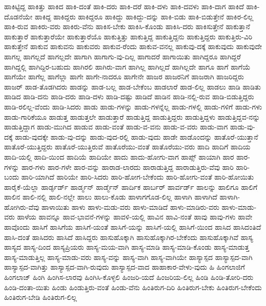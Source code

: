 {ಹಾಕಿಟ್ಟಿದ್ದ
ಹಾಕಿತ್ತು
ಹಾಕಿದ
ಹಾಕಿ-ದಂತೆ
ಹಾಕಿ-ದರು
ಹಾಕಿ-ದರೆ
ಹಾಕಿ-ದಳು
ಹಾಕಿ-ದವಳು
ಹಾಕಿ-ದಾಗ
ಹಾಕಿದೆ
ಹಾಕಿ-ದೊಡನೆಯೇ
ಹಾಕಿದ್ದ
ಹಾಕಿದ್ದರು
ಹಾಕಿದ್ದರೂ
ಹಾಕಿದ್ದು
ಹಾಕಿದ್ದು-ದನ್ನು
ಹಾಕಿ-ಬಿಡು
ಹಾಕಿ-ಬಿಡುತ್ತೇನೆ
ಹಾಕಿರ-ಲಿಲ್ಲ
ಹಾಕಿ-ರುವ
ಹಾಕಿರು-ವರು
ಹಾಕಿರು-ವೆನು
ಹಾಕಿಸ-ಬೇಕು
ಹಾಕಿಸಿ-ಕೊಂಡು
ಹಾಕಿಸಿ-ದರು
ಹಾಕಿಸುತ್ತೇನೆ
ಹಾಕುತ್ತಾನೆ
ಹಾಕುತ್ತಾರೆ
ಹಾಕುತ್ತಾರೆಯೇ
ಹಾಕುತ್ತಾರೆಯೊ
ಹಾಕುತ್ತಿತ್ತು
ಹಾಕುತ್ತಿದ್ದ
ಹಾಕುತ್ತಿದ್ದನು
ಹಾಕುತ್ತಿದ್ದರು
ಹಾಕುತ್ತಿರು-ವಿರಿ
ಹಾಕುತ್ತೇನೆ
ಹಾಕುವ
ಹಾಕುವನು
ಹಾಕುವರು
ಹಾಕುವ-ರೆಂದು
ಹಾಕುವ-ವನಲ್ಲ
ಹಾಕುವು-ದಕ್ಕೆ
ಹಾಕುವುದು
ಹಾಕುವುದೇ
ಹಾಗಲ್ಲ
ಹಾಗಲ್ಲದೆ
ಹಾಗಲ್ಲದೇ
ಹಾಗಾಗಿ
ಹಾಗಾಗು-ವು-ದಿಲ್ಲ
ಹಾಗಾದರೆ
ಹಾಗಾಯಿತು
ಹಾಗಿದ್ದರೂ
ಹಾಗಿದ್ದರೆ
ಹಾಗಿದ್ದಲ್ಲಿ
ಹಾಗಿದ್ದಿರ-ಬಹುದು
ಹಾಗಿರಲಿ
ಹಾಗಿರು-ವಾಗ
ಹಾಗಿಲ್ಲ
ಹಾಗಿಲ್ಲದೆ
ಹಾಗಿಲ್ಲದೇ
ಹಾಗೂ
ಹಾಗೆ
ಹಾಗೆಯೆ
ಹಾಗೆಯೇ
ಹಾಗೆಲ್ಲ
ಹಾಗೆಲ್ಲಾ
ಹಾಗೇ
ಹಾಗೇ-ನಾದರೂ
ಹಾಗೇನೇ
ಹಾಜರ
ಹಾಜರನಿಗೆ
ಹಾಜರಾಗಿ
ಹಾಜರಿದ್ದರು
ಹಾಜರ್
ಹಾಡ-ತೊಡಗಿದರು
ಹಾಡನ್ನು
ಹಾಡ-ಬಲ್ಲ
ಹಾಡ-ಬೇಕೆಂಬ
ಹಾಡಲಾರೆ
ಹಾಡ-ಲಿಲ್ಲ
ಹಾಡಲು
ಹಾಡಿ
ಹಾಡಿತು
ಹಾಡಿದ
ಹಾಡಿ-ದನು
ಹಾಡಿ-ದರು
ಹಾಡಿ-ದಳು
ಹಾಡಿ-ದಷ್ಟು
ಹಾಡಿದೆ
ಹಾಡಿನ
ಹಾಡಿ-ನಲ್ಲಿ-ರುವ
ಹಾಡಿ-ಬಿಡುತ್ತಿದ್ದರು
ಹಾಡಿ-ರಲಿಲ್ಲ-ವೆಂದು
ಹಾಡಿ-ಸಿದರು
ಹಾಡು
ಹಾಡು-ಗಳನ್ನು
ಹಾಡು-ಗಳನ್ನೆಲ್ಲ
ಹಾಡು-ಗಳಲ್ಲಿ
ಹಾಡು-ಗಳಿಗೆ
ಹಾಡು-ಗಳು
ಹಾಡು-ಗಾರಿಕೆಯೂ
ಹಾಡುತ್ತ
ಹಾಡುತ್ತಲೇ
ಹಾಡುತ್ತಾರೆ
ಹಾಡುತ್ತಿದ್ದ
ಹಾಡುತ್ತಿದ್ದರು
ಹಾಡುತ್ತಿದ್ದಳು
ಹಾಡುತ್ತಿದ್ದವ-ನನ್ನು
ಹಾಡುತ್ತಿದ್ದಾಗ
ಹಾಡು-ಮುಗಿದ
ಹಾಡುವ
ಹಾಡು-ವಂತೆ
ಹಾಡು-ವ-ವನು
ಹಾಡು-ವ-ವರು
ಹಾಡು-ವಾಗ
ಹಾಡು-ವು-ದಕ್ಕೆ
ಹಾಡು-ವುದಕ್ಕೇ
ಹಾಡು-ವು-ದನ್ನು
ಹಾಡು-ವುದ-ರಲ್ಲಿ
ಹಾಡು-ವುದು
ಹಾಡೇ
ಹಾಡೊಂದನ್ನು
ಹಾತೊರೆ-ಯುತ್ತಾನೆ
ಹಾತೊರೆ-ಯುತ್ತಿದ್ದರು
ಹಾತೊರೆ-ಯುತ್ತಿರುವೆ
ಹಾತೊರೆಯು-ವಂತೆ
ಹಾತೊರೆಯು-ವರು
ಹಾದಿ
ಹಾದಿಗೆ
ಹಾದಿಯ
ಹಾದಿ-ಯಲ್ಲಿ
ಹಾದಿ-ಯಿಂದ
ಹಾದಿಯೆ
ಹಾದಿಯೇ
ಹಾದು
ಹಾದು-ಹೋಗು-ವಾಗ
ಹಾಪ್ಸ್
ಹಾಯಾಗಿ
ಹಾರ
ಹಾರ-ಗಳನ್ನು
ಹಾರ-ಗಳು
ಹಾರ-ಗಳೇ
ಹಾರ-ವನ್ನು
ಹಾರಾಡ-ಲಾರದು
ಹಾರಾಡುತ್ತಿದ್ದ
ಹಾರಾಡುತ್ತಿರು-ವೆವು
ಹಾರಿ
ಹಾರಿ-ಬಂದು
ಹಾರಿ-ಯಾಗಿದೆ
ಹಾರಿಯೇ
ಹಾರಿ-ಸಿದರು
ಹಾರಿ-ಹೋಗ-ಬೇಕೆಂದು
ಹಾರಿ-ಹೋಗು-ವಂತೆ
ಹಾರಿ-ಹೋಯಿತು
ಹಾರೈಕೆ-ಯೆಲ್ಲಾ
ಹಾರ್ಡ್ಫರ್ಡ್
ಹಾರ್ಡ್ಮನ್
ಹಾರ್ಡ್ಮೆನ್
ಹಾರ್ದಿಕ
ಹಾರ್ಬರ್
ಹಾರ್ವರ್ಡ್
ಹಾಲನ್ನು
ಹಾಲಿಗೂ
ಹಾಲಿಗೆ
ಹಾಲಿನ
ಹಾಲಿ-ನಲ್ಲಿ
ಹಾಲಿ-ನಲ್ಲೇ
ಹಾಲು
ಹಾಲು-ಕೊಡು
ಹಾಳಾಗಗೊಡ-ಲಿಲ್ಲ
ಹಾಳಾಗಿ
ಹಾಳಾಗಿದೆ
ಹಾಳಾಗಿ-ಹೋಗಿರು-ವೆವು
ಹಾಳಾಯಿತು
ಹಾಳು
ಹಾಳು-ಮಡು-ವರು
ಹಾಳು-ಮಾಡಿದೆ
ಹಾಳು-ಮಾಡಿರು-ವರು
ಹಾಳು-ಮಾಡು-ವರು
ಹಾಳೆಯ
ಹಾವನ್ನೂ
ಹಾವ-ಭಾವನೆ-ಗಳನ್ನು
ಹಾವಳಿ-ಯಲ್ಲಿ
ಹಾವಿನ
ಹಾವಿ-ನಂತೆ
ಹಾವು
ಹಾವು-ಗಳು
ಹಾವೇ
ಹಾವೊಂದು
ಹಾಸಿಗೆ
ಹಾಸಿಗೆಯ
ಹಾಸಿಗೆ-ಯಂತೆ
ಹಾಸಿಗೆ-ಯನ್ನು
ಹಾಸಿಗೆ-ಯಲ್ಲಿ
ಹಾಸಿಗೆ-ಯಿಂದ
ಹಾಸಿದ
ಹಾಸಿದಂತಿದೆ
ಹಾಸಿ-ದಂತೆ
ಹಾಸಿದರು
ಹಾಸಿದೆ
ಹಾಸಿದ್ದರು
ಹಾಸುಹೊಕ್ಕಾಗಿ
ಹಾಸುಹೊಕ್ಕಾಗಿರ-ಬೇಕೆಂದು
ಹಾಸುಹೊಕ್ಕಾಗಿವೆ
ಹಾಸ್ಯ
ಹಾಸ್ಯದ
ಹಾಸ್ಯ-ದಿಂದ
ಹಾಸ್ಯಪ್ರಿಯರು
ಹಾಸ್ಯ-ಮಯ-ವಾಗಿ
ಹಾಸ್ಯ-ಮಾಡಿ
ಹಾಸ್ಯ-ಮಾಡಿ-ಕೊಂಡು
ಹಾಸ್ಯ-ಮಾಡುತ್ತ
ಹಾಸ್ಯ-ಮಾಡುತ್ತಿಲ್ಲ
ಹಾಸ್ಯ-ಮಾಡು-ವರು
ಹಾಸ್ಯ-ವನ್ನು
ಹಾಸ್ಯ-ವಾಗಿ
ಹಾಸ್ಯ-ವಾಗಿಯೇ
ಹಾಸ್ಯಾಸ್ಪದ
ಹಾಸ್ಯಾಸ್ಪದ-ವಾಗಿ
ಹಾಸ್ಯಾಸ್ಪದ-ವಾಗಿತ್ತು
ಹಾಸ್ಯಾಸ್ಪದ-ವಾಗಿ-ರುವುದು
ಹಾಸ್ಯಾಸ್ಪದ-ವಾದ
ಹಾಹಾಕಾರ-ವೇಳು-ವುದು
ಹಿ
ಹಿಂಗಲಾಜಿಗೆ
ಹಿಂಗಲಾಜ್
ಹಿಂಗಿ
ಹಿಂಗಿಸ-ಲಾರವು
ಹಿಂಗಿಸಿ-ಕೊಳ್ಳಲಿ
ಹಿಂಜರಿ-ಯದೆ
ಹಿಂಜರಿಯ-ಲಿಲ್ಲ
ಹಿಂಡಿ
ಹಿಂಡಿ-ತೋರಿ-ದರು
ಹಿಂಡಿ-ದಂತಾ-ಯಿತು
ಹಿಂಡು
ಹಿಂಡುತ್ತಿರು-ವಂತೆ
ಹಿಂಡು-ವೆನು
ಹಿಂತಿರುಗ-ದಿರಿ
ಹಿಂತಿರುಗ-ಬೇಕು
ಹಿಂತಿರುಗ-ಬೇಕೆಂದು
ಹಿಂತಿರುಗ-ಬೇಡಿ
ಹಿಂತಿರುಗ-ಲಿಲ್ಲ
}
